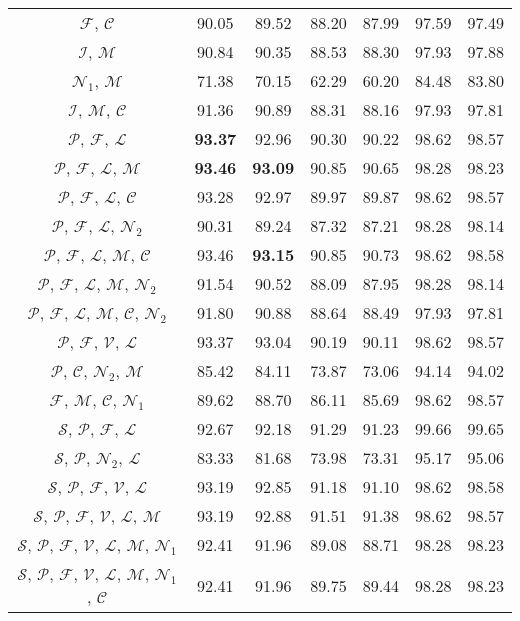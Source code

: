 \documentclass{llncs}
\begin{document}
\begin{table*}[htb]
\begin{tabular}{c c c c c c c}
$\mathcal{F}$, $\mathcal{C}$ & 90.05 & 89.52 & 88.20 & 87.99 & 97.59 & 97.49 \\
$\mathcal{I}$, $\mathcal{M}$ & 90.84 & 90.35 & 88.53 & 88.30 & 97.93 & 97.88 \\
$\mathcal{N}_1$, $\mathcal{M}$ & 71.38 & 70.15 & 62.29 & 60.20 & 84.48 & 83.80 \\
$\mathcal{I}$, $\mathcal{M}$, $\mathcal{C}$ & 91.36 & 90.89 & 88.31 & 88.16 & 97.93 & 97.81 \\
$\mathcal{P}$, $\mathcal{F}$, $\mathcal{L}$ & \textbf{93.37} & 92.96 & 90.30 & 90.22 & 98.62 & 98.57 \\
$\mathcal{P}$, $\mathcal{F}$, $\mathcal{L}$, $\mathcal{M}$ & \textbf{93.46} & \textbf{93.09} & 90.85 & 90.65 & 98.28 & 98.23 \\
$\mathcal{P}$, $\mathcal{F}$, $\mathcal{L}$, $\mathcal{C}$ & 93.28 & 92.97 & 89.97 & 89.87 & 98.62 & 98.57 \\
$\mathcal{P}$, $\mathcal{F}$, $\mathcal{L}$, $\mathcal{N}_2$ & 90.31 & 89.24 & 87.32 & 87.21 & 98.28 & 98.14 \\
$\mathcal{P}$, $\mathcal{F}$, $\mathcal{L}$, $\mathcal{M}$, $\mathcal{C}$ & 93.46 & \textbf{93.15} & 90.85 & 90.73 & 98.62 & 98.58 \\
$\mathcal{P}$, $\mathcal{F}$, $\mathcal{L}$, $\mathcal{M}$, $\mathcal{N}_2$ & 91.54 & 90.52 & 88.09 & 87.95 & 98.28 & 98.14 \\
$\mathcal{P}$, $\mathcal{F}$, $\mathcal{L}$, $\mathcal{M}$, $\mathcal{C}$, $\mathcal{N}_2$ & 91.80 & 90.88 & 88.64 & 88.49 & 97.93 & 97.81 \\
$\mathcal{P}$, $\mathcal{F}$, $\mathcal{V}$, $\mathcal{L}$ & 93.37 & 93.04 & 90.19 & 90.11 & 98.62 & 98.57 \\
$\mathcal{P}$, $\mathcal{C}$, $\mathcal{N}_2$,  $\mathcal{M}$ & 85.42 & 84.11 & 73.87 & 73.06 & 94.14 & 94.02 \\
$\mathcal{F}$, $\mathcal{M}$, $\mathcal{C}$, $\mathcal{N}_1$ & 89.62 & 88.70 & 86.11 & 85.69 & 98.62 & 98.57 \\
$\mathcal{S}$, $\mathcal{P}$, $\mathcal{F}$, $\mathcal{L}$ & 92.67 & 92.18 & 91.29 & 91.23 & 99.66 & 99.65 \\
$\mathcal{S}$, $\mathcal{P}$, $\mathcal{N}_2$, $\mathcal{L}$ & 83.33 & 81.68 & 73.98 & 73.31 & 95.17 & 95.06 \\
$\mathcal{S}$, $\mathcal{P}$, $\mathcal{F}$, $\mathcal{V}$, $\mathcal{L}$ & 93.19 & 92.85 & 91.18 & 91.10 & 98.62 & 98.58 \\
$\mathcal{S}$, $\mathcal{P}$, $\mathcal{F}$, $\mathcal{V}$, $\mathcal{L}$, $\mathcal{M}$ & 93.19 & 92.88 & 91.51 & 91.38 & 98.62 & 98.57 \\
$\mathcal{S}$, $\mathcal{P}$, $\mathcal{F}$, $\mathcal{V}$, $\mathcal{L}$, $\mathcal{M}$, $\mathcal{N}_1$ & 92.41 & 91.96 & 89.08 & 88.71 & 98.28 & 98.23 \\
$\mathcal{S}$, $\mathcal{P}$, $\mathcal{F}$, $\mathcal{V}$, $\mathcal{L}$, $\mathcal{M}$, $\mathcal{N}_1$, $\mathcal{C}$ & 92.41 & 91.96 & 89.75 & 89.44 & 98.28 & 98.23 \\
\bottomrule
\end{tabular}
\label{tbl:eval}
\end{table*}
\end{document}
